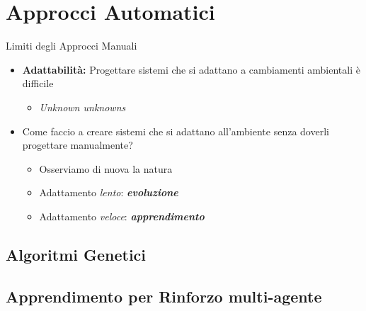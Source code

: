 \documentclass[presentation, 10pt,aspectratio=169]{beamer}\mode<presentation>{\usetheme{AMSBolognaFC}}
\begin{document}
\section{Approcci Automatici}
\begin{frame}{Limiti degli Approcci Manuali}
	\begin{itemize}
		\item \textbf{Adattabilità:} Progettare sistemi che si adattano a cambiamenti ambientali è \alert{difficile}
		\begin{itemize}
			\item \emph{Unknown unknowns}
		\end{itemize}
		\item Come faccio a creare sistemi che si adattano all'ambiente senza doverli progettare manualmente?
		\begin{itemize}
			\item Osserviamo di nuova la natura \alert{\faSmileO}
			\item Adattamento \emph{lento}: \textbf{\emph{evoluzione}}
			\item Adattamento \emph{veloce}: \textbf{\emph{apprendimento}}
		\end{itemize}
	\end{itemize}
\end{frame}
	\subsection{Algoritmi Genetici}

	\subsection{Apprendimento per Rinforzo multi-agente}
\end{document}
